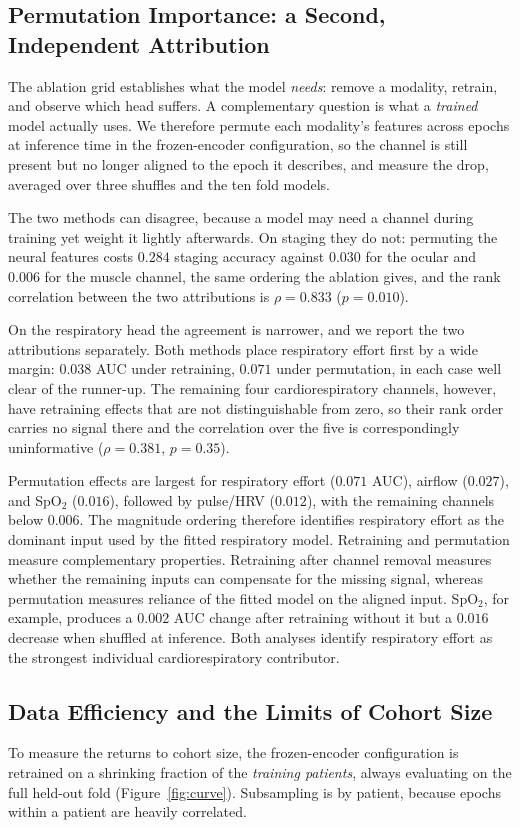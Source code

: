 \documentclass{ieeeaccess}
\begin{document}
\subsection{Permutation Importance: a Second, Independent Attribution}
The ablation grid establishes what the model \emph{needs}: remove a modality, retrain, and
observe which head suffers. A complementary question is what a \emph{trained} model actually
uses. We therefore permute each modality's features across epochs at inference time in the
frozen-encoder configuration, so the
channel is still present but no longer aligned to the epoch it describes, and measure the
drop, averaged over three shuffles and the ten fold models.

The two methods can disagree, because a model may need a channel during training yet weight it
lightly afterwards. On staging they do not: permuting the neural features costs $0.284$ staging
accuracy against $0.030$ for the ocular and $0.006$ for the muscle channel, the same ordering
the ablation gives, and the rank correlation between the two attributions is $\rho=0.833$
($p=0.010$).

On the respiratory head the agreement is narrower, and we report the two attributions
separately. Both methods place respiratory effort first by a wide
margin: $0.038$ AUC under retraining, $0.071$ under permutation, in each case well clear of
the runner-up. The remaining four cardiorespiratory channels, however, have retraining effects
that are not distinguishable from zero, so their rank order carries no signal there and the
correlation over the five is correspondingly uninformative ($\rho=0.381$, $p=0.35$).

Permutation effects are largest for respiratory effort ($0.071$ AUC), airflow ($0.027$), and SpO$_2$ ($0.016$), followed by pulse/HRV ($0.012$), with the remaining channels below $0.006$. The magnitude ordering therefore identifies respiratory effort as the dominant input used by the fitted respiratory model. Retraining and permutation measure complementary properties. Retraining after channel removal measures whether the remaining inputs can compensate for the missing signal, whereas permutation measures reliance of the fitted model on the aligned input. SpO$_2$, for example, produces a $0.002$ AUC change after retraining without it but a $0.016$ decrease when shuffled at inference. Both analyses identify respiratory effort as the strongest individual
cardiorespiratory contributor.

\subsection{Data Efficiency and the Limits of Cohort Size}
\label{sec:curve}
To measure the returns to cohort size, the frozen-encoder configuration is retrained on a
shrinking fraction of the \emph{training patients}, always evaluating on the full held-out fold
(Figure~\ref{fig:curve}). Subsampling is by patient,
because epochs within a patient are heavily correlated.
\end{document}
